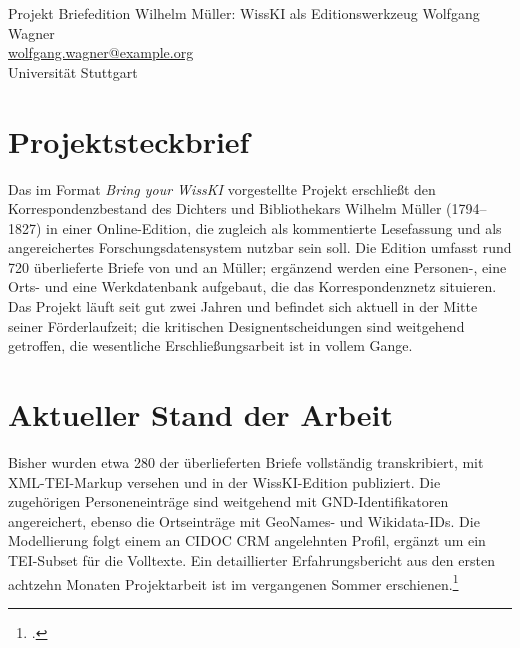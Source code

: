 \graphicspath{{abstracts/byw/01-briefedition-mueller/img/}{img/}}

\begin{beitrag}{Projekt \glqq Briefedition Wilhelm Müller\grqq{}: WissKI als Editionswerkzeug}{%
Wolfgang Wagner\, \\
\small \href{mailto:wolfgang.wagner@example.org}{wolfgang.wagner@example.org} \\
\small Universität Stuttgart
}

\begin{abstract}
Das Projekt erschließt den Korrespondenzbestand des Dichters Wilhelm Müller (1794--1827) in einer Online-Edition, die WissKI als Editionswerkzeug nutzt und TEI-XML-Volltexte mit einem CIDOC-CRM-angelehnten Forschungsdatenprofil kombiniert; von 720 überlieferten Briefen wurden bislang etwa 280 transkribiert, mit TEI-Markup versehen und um GND-, GeoNames- und Wikidata-Identifikatoren angereichert. Zur Diskussion gestellt werden drei offene Fragen: Granularität der Annotation (insbesondere konzeptuelle Erschließungsbegriffe), der Übergang in einen institutionellen Daueretat sowie die Anbindung an externe Editionsplattformen.
\end{abstract}

\section{Projektsteckbrief}
Das im Format \emph{Bring your WissKI} vorgestellte Projekt erschließt den Korrespondenzbestand des Dichters und Bibliothekars Wilhelm Müller (1794--1827) in einer Online-Edition, die zugleich als kommentierte Lesefassung und als angereichertes Forschungsdatensystem nutzbar sein soll. Die Edition umfasst rund 720 überlieferte Briefe von und an Müller; ergänzend werden eine Personen-, eine Orts- und eine Werkdatenbank aufgebaut, die das Korrespondenznetz situieren. Das Projekt läuft seit gut zwei Jahren und befindet sich aktuell in der Mitte seiner Förderlaufzeit; die kritischen Designentscheidungen sind weitgehend getroffen, die wesentliche Erschließungsarbeit ist in vollem Gange.

\section{Aktueller Stand der Arbeit}
Bisher wurden etwa 280 der überlieferten Briefe vollständig transkribiert, mit XML-TEI-Markup versehen und in der WissKI-Edition publiziert. Die zugehörigen Personeneinträge sind weitgehend mit GND-Identifikatoren angereichert, ebenso die Ortseinträge mit GeoNames- und Wikidata-IDs. Die Modellierung folgt einem an CIDOC CRM angelehnten Profil, ergänzt um ein TEI-Subset für die Volltexte. Ein detaillierter Erfahrungsbericht aus den ersten achtzehn Monaten Projektarbeit ist im vergangenen Sommer erschienen.\footcite[208]{wagner2024-mueller-bericht}


\end{beitrag}
